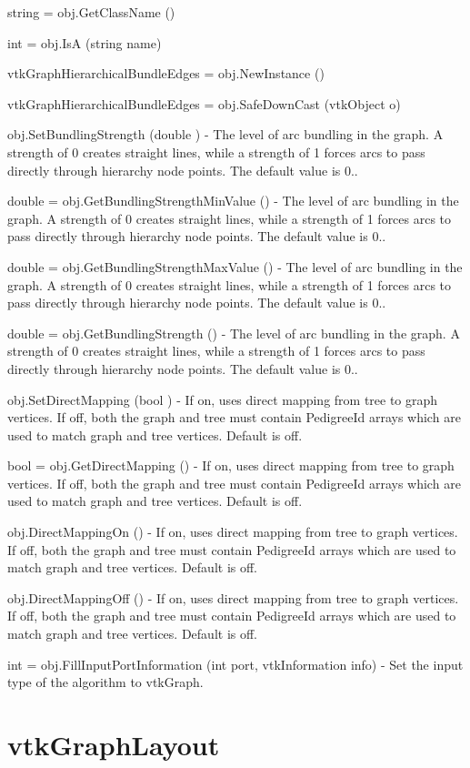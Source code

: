 \begin{DoxyItemize}
\item {\ttfamily string = obj.\-Get\-Class\-Name ()}  
\item {\ttfamily int = obj.\-Is\-A (string name)}  
\item {\ttfamily vtk\-Graph\-Hierarchical\-Bundle\-Edges = obj.\-New\-Instance ()}  
\item {\ttfamily vtk\-Graph\-Hierarchical\-Bundle\-Edges = obj.\-Safe\-Down\-Cast (vtk\-Object o)}  
\item {\ttfamily obj.\-Set\-Bundling\-Strength (double )} -\/ The level of arc bundling in the graph. A strength of 0 creates straight lines, while a strength of 1 forces arcs to pass directly through hierarchy node points. The default value is 0..  
\item {\ttfamily double = obj.\-Get\-Bundling\-Strength\-Min\-Value ()} -\/ The level of arc bundling in the graph. A strength of 0 creates straight lines, while a strength of 1 forces arcs to pass directly through hierarchy node points. The default value is 0..  
\item {\ttfamily double = obj.\-Get\-Bundling\-Strength\-Max\-Value ()} -\/ The level of arc bundling in the graph. A strength of 0 creates straight lines, while a strength of 1 forces arcs to pass directly through hierarchy node points. The default value is 0..  
\item {\ttfamily double = obj.\-Get\-Bundling\-Strength ()} -\/ The level of arc bundling in the graph. A strength of 0 creates straight lines, while a strength of 1 forces arcs to pass directly through hierarchy node points. The default value is 0..  
\item {\ttfamily obj.\-Set\-Direct\-Mapping (bool )} -\/ If on, uses direct mapping from tree to graph vertices. If off, both the graph and tree must contain Pedigree\-Id arrays which are used to match graph and tree vertices. Default is off.  
\item {\ttfamily bool = obj.\-Get\-Direct\-Mapping ()} -\/ If on, uses direct mapping from tree to graph vertices. If off, both the graph and tree must contain Pedigree\-Id arrays which are used to match graph and tree vertices. Default is off.  
\item {\ttfamily obj.\-Direct\-Mapping\-On ()} -\/ If on, uses direct mapping from tree to graph vertices. If off, both the graph and tree must contain Pedigree\-Id arrays which are used to match graph and tree vertices. Default is off.  
\item {\ttfamily obj.\-Direct\-Mapping\-Off ()} -\/ If on, uses direct mapping from tree to graph vertices. If off, both the graph and tree must contain Pedigree\-Id arrays which are used to match graph and tree vertices. Default is off.  
\item {\ttfamily int = obj.\-Fill\-Input\-Port\-Information (int port, vtk\-Information info)} -\/ Set the input type of the algorithm to vtk\-Graph.  
\end{DoxyItemize}\hypertarget{vtkinfovis_vtkgraphlayout}{}\section{vtk\-Graph\-Layout}\label{vtkinfovis_vtkgraphlayout}
